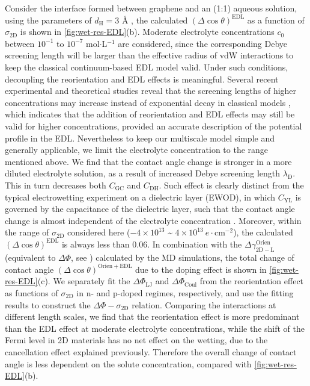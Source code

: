 Consider the interface formed between graphene and an (1:1) aqueous
solution, using the parameters of \(d_{\mathrm{H}}=3\) Å
\cite{Mcclendon_1927_helmholtz_EDL},
the calculated \((\Delta \cos \theta)^{\mathrm{EDL}}\) as a function
of \(\sigma_{\mathrm{2D}}\) is shown in \autoref{fig:wet-res-EDL}(b).
%
Moderate electrolyte
concentrations \(c_{0}\) between \(10^{-1}\) to \(10^{-7}\)
mol\(\cdot\)L\(^{-1}\) are considered, since the corresponding Debye
screening length will be larger than the effective radius of vdW
interactions to keep the classical continuum-based EDL model valid.
Under such conditions, decoupling the reorientation and EDL effects is
meaningful.
%
Several recent experimental and theoretical studies reveal that
the screening lengths of higher concentrations may increase instead of
exponential decay in classical models
\cite{Smith_2016_screening,Lee_2017_scaling}, which indicates that the
addition of reorientation and EDL effects may still be valid for
higher concentrations, provided an accurate description of the
potential profile in the EDL. Nevertheless to keep our multiscale
model simple and generally applicable, we limit the electrolyte
concentration to the range mentioned above.
We find that the contact angle change is stronger in a
more diluted electrolyte solution, as a result of  increased Debye
screening length \(\lambda_{\mathrm{D}}\). This in turn decreases
both \(C_{\mathrm{GC}}\) and \(C_{\mathrm{DH}}\).
%
Such effect is clearly distinct from the typical electrowetting
experiment on a dielectric layer (EWOD), in
which \(C_{\mathrm{YL}}\) is governed by the capacitance of the
dielectric layer, such that the contact angle change is almost independent of
the electrolyte concentration \cite{Mugele_2005_EW_rev}.
%
Moreover,
within the range of \(\sigma_{\mathrm{2D}}\) considered here
(\(-4\times10^{13}\) \textasciitilde{}
\(4\times10^{13}\ e\cdot \mathrm{cm}^{-2}\)), the calculated
\((\Delta \cos \theta)^{\mathrm{EDL}}\) is always less than 0.06.  In
combination with the
\(\Delta \gamma^{\mathrm{Orien}}_{\mathrm{2D-L}}\) (equivalent to
\(\Delta \Phi\), see ) calculated by the MD
simulations, the total change of contact angle
\((\Delta \cos \theta)^{\mathrm{Orien + EDL}}\) due to the doping
effect is shown in \autoref{fig:wet-res-EDL}(c). We separately fit the
\(\Delta \Phi_{\mathrm{LJ}}\) and \(\Delta \Phi_{\mathrm{Coul}}\) from
the reorientation effect as functions of \(\sigma_{\mathrm{2D}}\) in
n- and p-doped regimes, respectively, and use the fitting
results to construct the \(\Delta \Phi-\sigma_{\mathrm{2D}}\)
relation. Comparing the interactions at different length scales, we
find that the reorientation effect is more predominant than the EDL
effect at moderate electrolyte concentrations, while the shift of the
Fermi level in 2D materials has no net effect on the wetting, due to
the cancellation effect explained previously. Therefore the overall
change of contact angle is less dependent on the solute concentration,
compared with \autoref{fig:wet-res-EDL}(b).

